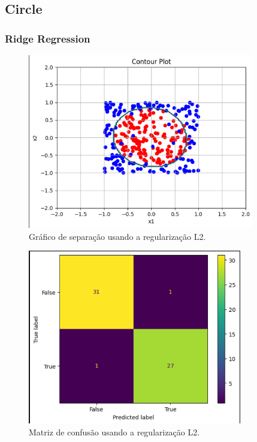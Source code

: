 \documentclass{article}
\begin{document}
\newpage


\subsection*{Circle}

\vspace{15pt}

\subsubsection*{Ridge Regression}

\vspace{25pt}

\begin{figure}[h]

    \centering
    \includegraphics[height=3in]{sep_circle_l2.png}
    \caption{Gráfico de separação usando a regularização L2.}
    \label{fig:example}
    
\end{figure}

\vspace{25pt}

\begin{figure}[h]

    \centering
    \includegraphics[height=3in]{conf_mat_circle_l2.png}
    \caption{Matriz de confusão usando a regularização L2.}
    \label{fig:example}
    
\end{figure}
\end{document}
